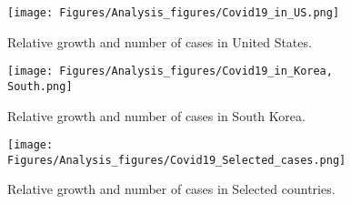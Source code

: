 \begin{figure}
    \centering
    \texttt{[image: Figures/Analysis\_figures/Covid19\_in\_US.png]}
    \caption{Relative growth and number of cases in United States.}\label{fig:US}
\end{figure}

\begin{figure}
    \centering
    \texttt{[image: Figures/Analysis\_figures/Covid19\_in\_Korea, South.png]}
    \caption{Relative growth and number of cases in South Korea.}\label{fig:SouthKorea}
\end{figure}

\begin{figure}
    \centering
    \texttt{[image: Figures/Analysis\_figures/Covid19\_Selected\_cases.png]}
    \caption{Relative growth and number of cases in Selected countries.}\label{fig:Selected}
\end{figure}
